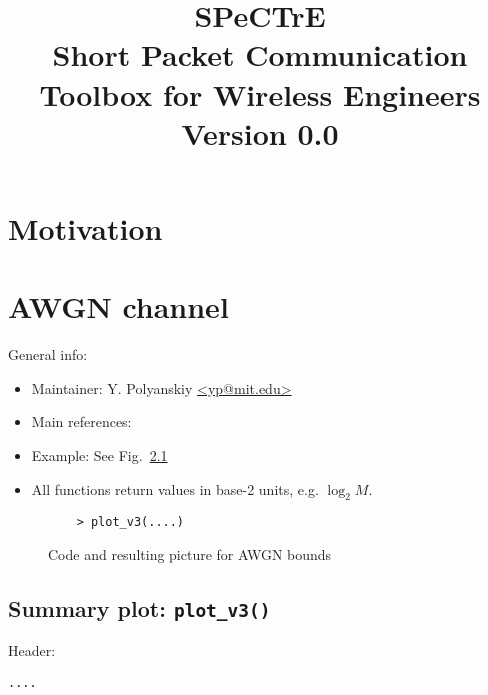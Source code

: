 \documentclass[a4paper,11p]{memoir}
\begin{document}
\title{SPeCTrE\\
Short Packet Communication Toolbox for Wireless Engineers\\[1cm]
Version 0.0}

\maketitle

\begin{abstract}
  
\end{abstract}
\newpage
\tableofcontents

\newpage
\chapter{Motivation}
\chapter{AWGN channel}


General info:
\begin{itemize}
\item Maintainer: Y. Polyanskiy \url{<yp@mit.edu>}

\item Main references: \cite{PPV08,PPV10eneff}

\item Example: See Fig.~\ref{fig:awgn_example} 

\item All functions return values in base-2 units, e.g. $\log_2 M$.
\end{itemize}


\begin{figure}
\caption{Code and resulting picture for AWGN bounds}\label{fig:awgn_example}
\begin{verbatim}
	> plot_v3(....)
\end{verbatim}
\end{figure}


\cprotect\section{Summary plot: \verb|plot_v3()|}

Header:
\begin{verbatim}
....
\end{verbatim}
\end{document}
